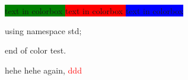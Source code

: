 \documentclass{article}
\begin{document}
\color{green}{abc}
\color{red}{abc}
\color{blue}{abc}
\color{black}{}     %

\colorbox{green}{
    text in colorbox
}
\colorbox{red}{
    text in colorbox
}
\colorbox{blue}{
    text in colorbox
}

\colorbox{green}{
}

\newcommand{\codecomment}[1]{
    \color{green}{#1}
    \color{black}{}
}


using namespace std;    \codecomment{//comment here}

end of color test.

\textcolor{blue!70}{hehe}
hehe again, \textcolor{red}{ddd}
\end{document}
